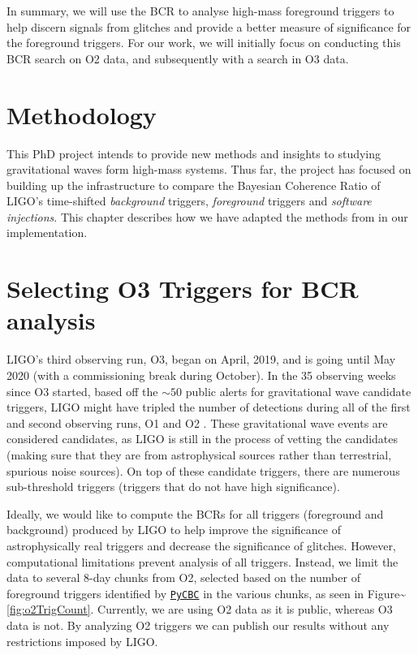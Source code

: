 \documentclass[%
 reprint,
 amsmath,amssymb,
 aps,
]{revtex4}
\begin{document}
In summary, we will use the BCR to analyse high-mass foreground triggers to help discern signals from glitches and
provide a better measure of significance for the foreground triggers. For our work, we will initially focus on
conducting this BCR search on O2 data, and subsequently with a search in O3 data.


\section{Methodology}\label{methodology}
This PhD project intends to provide new methods and insights to studying gravitational waves form high-mass systems.
Thus far, the project has focused on building up the infrastructure to compare the Bayesian Coherence Ratio of LIGO's
time-shifted \emph{background} triggers, \emph{foreground} triggers and \emph{software injections}. This chapter describes how we have
adapted the methods from \citet{bcr_paper} in our implementation.

\hypertarget{selecting-o3-triggers-for-bcr-analysis}{%
\section{Selecting O3 Triggers for BCR analysis}\label{selecting-o3-triggers-for-bcr-analysis}}

LIGO's third observing run, O3, began on April, 2019, and is going until May 2020 (with a commissioning break during
October). In the 35 observing weeks since O3 started, based off the \(\sim50\) public alerts for gravitational wave
candidate triggers, LIGO might have tripled the number of detections during all of the first and second observing runs,
O1 and O2 \citep{gracedb}. These gravitational wave events are considered candidates, as LIGO is still in the process of vetting the
candidates (making sure that they are from astrophysical sources rather than terrestrial, spurious noise sources). On
top of these candidate triggers, there are numerous sub-threshold triggers (triggers that do not have high
significance).

Ideally, we would like to compute the BCRs for all triggers (foreground and background) produced by LIGO to help improve
the significance of astrophysically real triggers and decrease the significance of glitches. However, computational
limitations prevent analysis of all triggers. Instead, we limit the data to several 8-day chunks from O2, selected based
on the number of foreground triggers identified by \href{https://pycbc.org/}{\texttt{PyCBC}} in the various chunks, as seen in
Figure\textasciitilde\ref{fig:o2TrigCount}. Currently, we are using O2 data as it is public, whereas O3 data is not. By analyzing O2
triggers we can publish our results without any restrictions imposed by LIGO.
\end{document}

